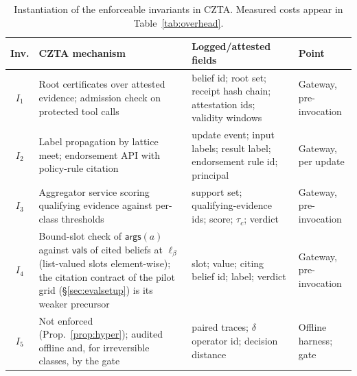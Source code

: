 \documentclass[conference,compsoc]{IEEEtran}
\theoremstyle{definition}
\theoremstyle{plain}
\newcommand{\Ione}{\ensuremath{I_1}}
\newcommand{\Itwo}{\ensuremath{I_2}}
\newcommand{\Ithree}{\ensuremath{I_3}}
\newcommand{\Ifour}{\ensuremath{I_4}}
\newcommand{\Ifive}{\ensuremath{I_5}}
\providecommand{\tc}{\tau_{c}}
\newcommand{\args}{\ensuremath{\mathsf{args}}}
\newcommand{\vals}{\ensuremath{\mathsf{vals}}}
\newcommand{\bindpol}{\ensuremath{\beta}}
\begin{document}
\begin{table}[t]
\centering
\caption{Instantiation of the enforceable invariants in CZTA.
Measured costs appear in Table~\ref{tab:overhead}.}
\label{tab:instantiation}
\scriptsize
\setlength{\tabcolsep}{2.5pt}
\begin{tabularx}{\columnwidth}{@{}c >{\raggedright\arraybackslash}p{2.3cm} >{\raggedright\arraybackslash}X >{\raggedright\arraybackslash}p{1.45cm}@{}}
\toprule
Inv. & CZTA mechanism & Logged/attested fields & Point \\
\midrule
\Ione & Root certificates over attested evidence; admission check on protected tool calls & belief id; root set; receipt hash chain; attestation ids; validity windows & Gateway, pre-invocation \\
\Itwo & Label propagation by lattice meet; endorsement API with policy-rule citation & update event; input labels; result label; endorsement rule id; principal & Gateway, per update \\
\Ithree & Aggregator service scoring qualifying evidence against per-class thresholds & support set; qualifying-evidence ids; score; $\tc$; verdict & Gateway, pre-invocation \\
\Ifour & Bound-slot check of $\args(a)$ against $\vals$ of cited beliefs at $\ell_{\bindpol}$ (list-valued slots element-wise); the citation contract of the pilot grid (\S\ref{sec:evalsetup}) is its weaker precursor & slot; value; citing belief id; label; verdict & Gateway, pre-invocation \\
\Ifive & Not enforced (Prop.~\ref{prop:hyper}); audited offline and, for irreversible classes, by the gate & paired traces; $\delta$ operator id; decision distance & Offline harness; gate \\
\bottomrule
\end{tabularx}
\end{table}
\end{document}
